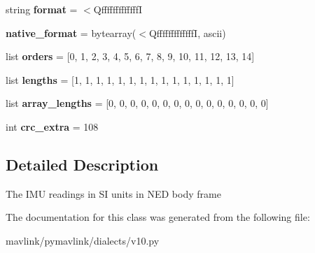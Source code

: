 \begin{DoxyCompactItemize}
\item 
\mbox{\label{classpymavlink_1_1dialects_1_1v10_1_1MAVLink__hil__sensor__message_a3da2b98097a75108f0032460da6fe45e}} 
string {\bfseries format} = \textquotesingle{}$<$QfffffffffffffI\textquotesingle{}
\item 
\mbox{\label{classpymavlink_1_1dialects_1_1v10_1_1MAVLink__hil__sensor__message_aaaf577eb773e1faaebf3e36aefca6767}} 
{\bfseries native\+\_\+format} = bytearray(\textquotesingle{}$<$QfffffffffffffI\textquotesingle{}, \textquotesingle{}ascii\textquotesingle{})
\item 
\mbox{\label{classpymavlink_1_1dialects_1_1v10_1_1MAVLink__hil__sensor__message_a851949a32e3760b1b61e92bbacda114c}} 
list {\bfseries orders} = \mbox{[}0, 1, 2, 3, 4, 5, 6, 7, 8, 9, 10, 11, 12, 13, 14\mbox{]}
\item 
\mbox{\label{classpymavlink_1_1dialects_1_1v10_1_1MAVLink__hil__sensor__message_a26e723bfecc8d7db4551afc0ffadd1c9}} 
list {\bfseries lengths} = \mbox{[}1, 1, 1, 1, 1, 1, 1, 1, 1, 1, 1, 1, 1, 1, 1\mbox{]}
\item 
\mbox{\label{classpymavlink_1_1dialects_1_1v10_1_1MAVLink__hil__sensor__message_a87d88a52d5c519c73b016ec5fbfeea00}} 
list {\bfseries array\+\_\+lengths} = \mbox{[}0, 0, 0, 0, 0, 0, 0, 0, 0, 0, 0, 0, 0, 0, 0\mbox{]}
\item 
\mbox{\label{classpymavlink_1_1dialects_1_1v10_1_1MAVLink__hil__sensor__message_a4fdc8b36dc86ed6b44fb4e989835f292}} 
int {\bfseries crc\+\_\+extra} = 108
\end{DoxyCompactItemize}


\subsection{Detailed Description}
\begin{DoxyVerb}The IMU readings in SI units in NED body frame
\end{DoxyVerb}
 

The documentation for this class was generated from the following file\+:\begin{DoxyCompactItemize}
\item 
mavlink/pymavlink/dialects/v10.\+py\end{DoxyCompactItemize}
